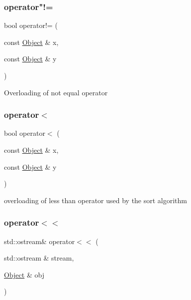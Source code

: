 \subsubsection{\texorpdfstring{operator"!=}{operator!=}}
{\footnotesize\ttfamily bool operator!= (\begin{DoxyParamCaption}\item[{const \hyperlink{classez_1_1objects_1_1Object}{Object} \&}]{x,  }\item[{const \hyperlink{classez_1_1objects_1_1Object}{Object} \&}]{y }\end{DoxyParamCaption})\hspace{0.3cm}{\ttfamily [friend]}}

Overloading of not equal operator \mbox{\label{classez_1_1objects_1_1Object_a6f011ffc58727a1b133e9cace6f5d79a}} 
\subsubsection{\texorpdfstring{operator$<$}{operator<}}
{\footnotesize\ttfamily bool operator$<$ (\begin{DoxyParamCaption}\item[{const \hyperlink{classez_1_1objects_1_1Object}{Object} \&}]{x,  }\item[{const \hyperlink{classez_1_1objects_1_1Object}{Object} \&}]{y }\end{DoxyParamCaption})\hspace{0.3cm}{\ttfamily [friend]}}

overloading of less than operator used by the sort algorithm \mbox{\label{classez_1_1objects_1_1Object_a8c4aa17f8cf91b04c722b994a7028999}} 
\subsubsection{\texorpdfstring{operator$<$$<$}{operator<<}}
{\footnotesize\ttfamily std\+::ostream\& operator$<$$<$ (\begin{DoxyParamCaption}\item[{std\+::ostream \&}]{stream,  }\item[{\hyperlink{classez_1_1objects_1_1Object}{Object} \&}]{obj }\end{DoxyParamCaption})\hspace{0.3cm}{\ttfamily [friend]}}


